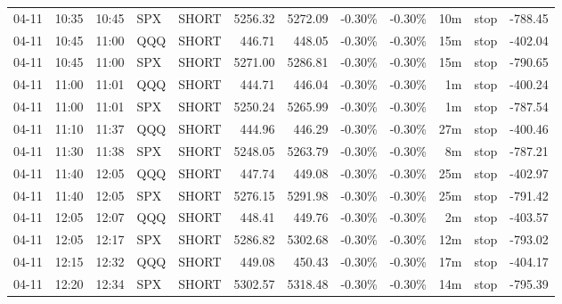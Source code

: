\documentclass[11pt,a4paper,twoside]{article}
\begin{document}
\begin{center}
\begin{longtable}{>{\color{txtmain}}l l l l l r r r r r >{\color{txtmain}}l r}
04-11 & 10:35 & 10:45 & SPX & SHORT & 5256.32 & 5272.09 & \textcolor{lossred}{-0.30\%} & \textcolor{lossred}{-0.30\%} & 10m & stop & \textcolor{lossred}{-788.45} \\
04-11 & 10:45 & 11:00 & QQQ & SHORT & 446.71 & 448.05 & \textcolor{lossred}{-0.30\%} & \textcolor{lossred}{-0.30\%} & 15m & stop & \textcolor{lossred}{-402.04} \\
04-11 & 10:45 & 11:00 & SPX & SHORT & 5271.00 & 5286.81 & \textcolor{lossred}{-0.30\%} & \textcolor{lossred}{-0.30\%} & 15m & stop & \textcolor{lossred}{-790.65} \\
04-11 & 11:00 & 11:01 & QQQ & SHORT & 444.71 & 446.04 & \textcolor{lossred}{-0.30\%} & \textcolor{lossred}{-0.30\%} & 1m & stop & \textcolor{lossred}{-400.24} \\
04-11 & 11:00 & 11:01 & SPX & SHORT & 5250.24 & 5265.99 & \textcolor{lossred}{-0.30\%} & \textcolor{lossred}{-0.30\%} & 1m & stop & \textcolor{lossred}{-787.54} \\
04-11 & 11:10 & 11:37 & QQQ & SHORT & 444.96 & 446.29 & \textcolor{lossred}{-0.30\%} & \textcolor{lossred}{-0.30\%} & 27m & stop & \textcolor{lossred}{-400.46} \\
04-11 & 11:30 & 11:38 & SPX & SHORT & 5248.05 & 5263.79 & \textcolor{lossred}{-0.30\%} & \textcolor{lossred}{-0.30\%} & 8m & stop & \textcolor{lossred}{-787.21} \\
04-11 & 11:40 & 12:05 & QQQ & SHORT & 447.74 & 449.08 & \textcolor{lossred}{-0.30\%} & \textcolor{lossred}{-0.30\%} & 25m & stop & \textcolor{lossred}{-402.97} \\
04-11 & 11:40 & 12:05 & SPX & SHORT & 5276.15 & 5291.98 & \textcolor{lossred}{-0.30\%} & \textcolor{lossred}{-0.30\%} & 25m & stop & \textcolor{lossred}{-791.42} \\
04-11 & 12:05 & 12:07 & QQQ & SHORT & 448.41 & 449.76 & \textcolor{lossred}{-0.30\%} & \textcolor{lossred}{-0.30\%} & 2m & stop & \textcolor{lossred}{-403.57} \\
04-11 & 12:05 & 12:17 & SPX & SHORT & 5286.82 & 5302.68 & \textcolor{lossred}{-0.30\%} & \textcolor{lossred}{-0.30\%} & 12m & stop & \textcolor{lossred}{-793.02} \\
04-11 & 12:15 & 12:32 & QQQ & SHORT & 449.08 & 450.43 & \textcolor{lossred}{-0.30\%} & \textcolor{lossred}{-0.30\%} & 17m & stop & \textcolor{lossred}{-404.17} \\
04-11 & 12:20 & 12:34 & SPX & SHORT & 5302.57 & 5318.48 & \textcolor{lossred}{-0.30\%} & \textcolor{lossred}{-0.30\%} & 14m & stop & \textcolor{lossred}{-795.39} \\

\end{longtable}
\end{center}
\end{document}
